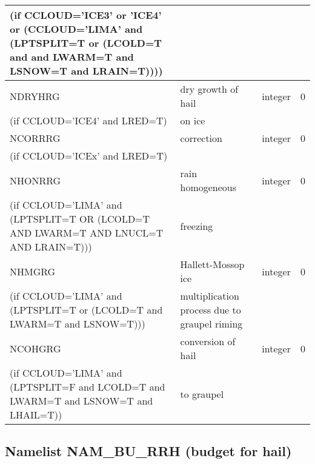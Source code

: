\begin{longtable} {|p{}|p{}|>{\centering}p{}|p{}<{\centering}|}
(if CCLOUD='ICE3' or 'ICE4' or (CCLOUD='LIMA' and (LPTSPLIT=T or (LCOLD=T and and LWARM=T and LSNOW=T and LRAIN=T)))) & &   &  \\\hline
NDRYHRG&    dry growth of hail& integer  &  0 \index{NDRYHRG!\innam{NAM\_BU\_RRG}}\\ \nopagebreak
(if CCLOUD='ICE4' and LRED=T) &  on ice&   &  \\\hline
NCORRRG&   correction & integer  &  0 \index{NCORRRG!\innam{NAM\_BU\_RRG}}\\ \nopagebreak
(if CCLOUD='ICEx' and LRED=T) &  &   &  \\\hline
NHONRRG  & rain homogeneous  & integer  &  0 \index{NHONRRG!\innam{NAM\_BU\_RRG}}\\ \nopagebreak
(if CCLOUD='LIMA' and (LPTSPLIT=T OR (LCOLD=T AND LWARM=T AND LNUCL=T AND LRAIN=T)))   & freezing  &       &   \\\hline
NHMGRG  & Hallett-Mossop ice  & integer  &  0 \index{NHMGRG!\innam{NAM\_BU\_RRG}}\\ \nopagebreak
(if CCLOUD='LIMA' and (LPTSPLIT=T or (LCOLD=T and LWARM=T and LSNOW=T))) & multiplication process due to graupel riming  &   &  \\\hline
NCOHGRG  & conversion of hail  & integer  &  0 \index{NCOHGRG!\innam{NAM\_BU\_RRG}}\\ \nopagebreak
(if CCLOUD='LIMA' and (LPTSPLIT=F and LCOLD=T and LWARM=T and LSNOW=T and LHAIL=T)) &to graupel  &   &  \\\hline
\end{longtable}

\subsection{Namelist NAM\_BU\_RRH (budget for hail)}

